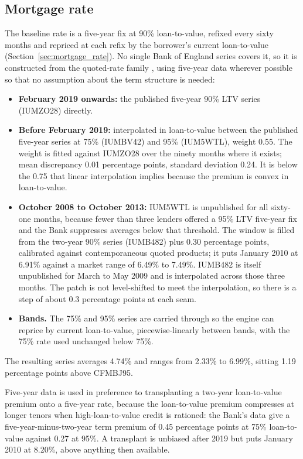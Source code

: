 \begin{appendices}
\subsection*{Mortgage rate}

The baseline rate is a five-year fix at 90\% loan-to-value, refixed every sixty months and repriced at each refix by the borrower's current loan-to-value (Section~\ref{sec:mortgage_rate}). No single Bank of England series covers it, so it is constructed from the quoted-rate family \parencite{boe_quoted}, using five-year data wherever possible so that no assumption about the term structure is needed:

\begin{itemize}
  \item \textbf{February 2019 onwards:} the published five-year 90\% LTV series (IUMZO28) directly.
  \item \textbf{Before February 2019:} interpolated in loan-to-value between the published five-year series at 75\% (IUMBV42) and 95\% (IUM5WTL), weight 0.55. The weight is fitted against IUMZO28 over the ninety months where it exists; mean discrepancy 0.01 percentage points, standard deviation 0.24. It is below the 0.75 that linear interpolation implies because the premium is convex in loan-to-value.
  \item \textbf{October 2008 to October 2013:} IUM5WTL is unpublished for all sixty-one months, because fewer than three lenders offered a 95\% LTV five-year fix and the Bank suppresses averages below that threshold. The window is filled from the two-year 90\% series (IUMB482) plus 0.30 percentage points, calibrated against contemporaneous quoted products; it puts January 2010 at 6.91\% against a market range of 6.49\% to 7.49\%. IUMB482 is itself unpublished for March to May 2009 and is interpolated across those three months. The patch is not level-shifted to meet the interpolation, so there is a step of about 0.3 percentage points at each seam.
  \item \textbf{Bands.} The 75\% and 95\% series are carried through so the engine can reprice by current loan-to-value, piecewise-linearly between bands, with the 75\% rate used unchanged below 75\%.
\end{itemize}

The resulting series averages 4.74\% and ranges from 2.33\% to 6.99\%, sitting 1.19 percentage points above CFMBJ95.

Five-year data is used in preference to transplanting a two-year loan-to-value premium onto a five-year rate, because the loan-to-value premium compresses at longer tenors when high-loan-to-value credit is rationed: the Bank's data give a five-year-minus-two-year term premium of 0.45 percentage points at 75\% loan-to-value against 0.27 at 95\%. A transplant is unbiased after 2019 but puts January 2010 at 8.20\%, above anything then available.


\end{appendices}
